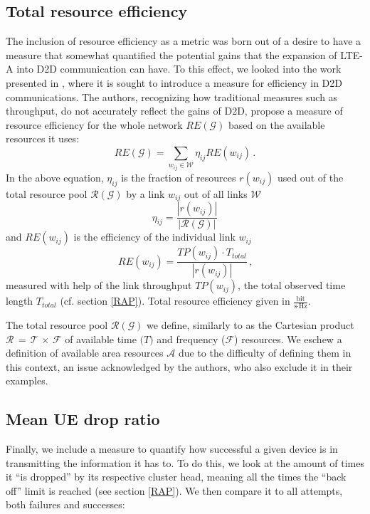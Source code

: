 \subsection{Total resource efficiency}\label{RE}
The inclusion of resource efficiency as a metric was born out of a desire to have a measure that somewhat quantified the potential gains that the expansion of LTE-A into D2D communication can have. To this effect, we looked into the work presented in \cite{Klugel2014}, where it is sought to introduce a measure for efficiency in D2D communications. The authors, recognizing how traditional measures such as throughput, do not accurately reflect the gains of D2D, propose a measure of resource efficiency for the whole network $RE(\mathcal{G})$ based on the available resources it uses:
\begin{equation}\label{eq:RE}
RE(\mathcal{G}) = \sum_{w_{ij}\in\mathcal{W}}\eta_{ij}RE(w_{ij})\,\text{.}
\end{equation}
In the above equation, $\eta_{ij}$ is the fraction of resources $r(w_{ij})$ used out of the total resource pool $\mathcal{R(G)}$ by a link $w_{ij}$ out of all links $\mathcal{W}$
\begin{equation}\label{eq:RE2}
\eta_{ij} = \frac {|r(w_{ij})|}{|\mathcal{R(G)}|}
\end{equation}
and $RE(w_{ij})$ is the efficiency of the individual link $w_{ij}$
\begin{equation}\label{eq:RE3}
RE(w_{ij}) = \frac {TP(w_{ij})\cdot T_{total}}{|r(w_{ij})|}\,\text{,}
\end{equation}
measured with help of the link throughput $TP(w_{ij})$, the total observed time length $T_{total}$ (cf. section \ref{RAP}). Total resource efficiency given in $\frac{\text{bit}}{\text{s}\cdot\text{Hz}}$.

The total resource pool $\mathcal{R(G)}$ we define, similarly to \cite{Klugel2014} as the Cartesian product $\mathcal{R\,=\,T\,\times\,F}$ of available time $\mathcal(T)$ and frequency ($\mathcal{F}$) resources. We eschew a definition of available area resources $\mathcal{A}$ due to the difficulty of defining them in this context, an issue acknowledged by the authors, who also exclude it in their examples.

\subsection{Mean UE drop ratio}
Finally, we include a measure to quantify how successful a given device is in transmitting the information it has to. To do this, we look at the amount of times it ``is dropped'' by its respective cluster head, meaning all the times the ``back off'' limit is reached (see section \ref{RAP}). We then compare it to all attempts, both failures and successes:

